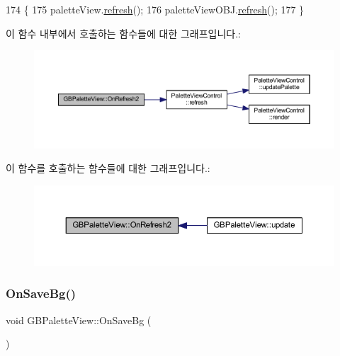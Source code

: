 \begin{DoxyCode}
174 \{
175   paletteView.\mbox{\hyperlink{class_palette_view_control_aace3ab97afe8216b3873159ee852779f}{refresh}}();
176   paletteViewOBJ.\mbox{\hyperlink{class_palette_view_control_aace3ab97afe8216b3873159ee852779f}{refresh}}();  
177 \}
\end{DoxyCode}
이 함수 내부에서 호출하는 함수들에 대한 그래프입니다.\+:
\nopagebreak
\begin{figure}[H]
\begin{center}
\leavevmode
\includegraphics[width=350pt]{class_g_b_palette_view_a15d94f40712405e466296772b7087f3f_cgraph}
\end{center}
\end{figure}
이 함수를 호출하는 함수들에 대한 그래프입니다.\+:
\nopagebreak
\begin{figure}[H]
\begin{center}
\leavevmode
\includegraphics[width=350pt]{class_g_b_palette_view_a15d94f40712405e466296772b7087f3f_icgraph}
\end{center}
\end{figure}
\mbox{\label{class_g_b_palette_view_a0186b41f6db460271256f36800ffa980}} 
\subsubsection{\texorpdfstring{On\+Save\+Bg()}{OnSaveBg()}}
{\footnotesize\ttfamily void G\+B\+Palette\+View\+::\+On\+Save\+Bg (\begin{DoxyParamCaption}{ }\end{DoxyParamCaption})\hspace{0.3cm}{\ttfamily [protected]}}



